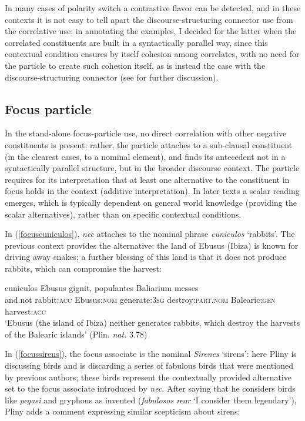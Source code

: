 \documentclass[output=paper,modfonts,nonflat,citecolor=brown,
showindex
]{langsci/langscibook}
\begin{document}
In many cases of polarity switch a contrastive flavor can be detected, and in these contexts it is not easy to tell apart the discourse-structuring connector use from the correlative use: in annotating the examples, I decided for the latter when the correlated constituents are built in a syntactically parallel way, since this contextual condition ensures by itself cohesion among correlates, with no need for the particle to create such cohesion itself, as is instead the case with the discourse-structuring connector (see \citealt[]{OrlandiniPoccetti07} for further discussion). 

\subsection{Focus particle} \label{functionfocusparticle}

In the stand-alone focus-particle use, no direct correlation with other negative constituents is present; rather, the particle attaches to a sub-clausal constituent (in the clearest cases, to a nominal element), and finds its antecedent not in a syntactically parallel structure, but in the broader discourse context. The particle requires for its interpretation that at least one alternative to the constituent in focus holds in the context (additive interpretation). In later texts a scalar reading emerges, which is typically dependent on general world knowledge (providing the scalar alternatives), rather than on specific contextual conditions. 

In (\ref{focuscuniculos}), {\emph{nec}} attaches to the nominal phrase {\emph{cuniculos}} `rabbits'. The previous context provides the alternative: the land of Ebusus (Ibiza) is known for driving away snakes; a further blessing of this land is that it does not produce rabbits, which can compromise the harvest: 

{\begin{exe}
\ex \label{focuscuniculos}  cuniculos Ebusus gignit, populantes Baliarium messes\\
and.not rabbit:{\textsc{acc}} Ebusus:{\textsc{nom}} generate:{\textsc{3sg}} destroy:{\textsc{part.nom}} Balearic:{\textsc{gen}} harvest:{\textsc{acc}}\\

`Ebusus (the island of Ibiza) neither generates rabbits, which destroy the harvests of the Balearic islands' (Plin. {\emph{nat.}} 3.78)
\end{exe}}

\noindent In (\ref{focussirens}), the focus associate is the nominal {\emph{Sirenes}} `sirens': here Pliny is discussing birds and is discarding a series of fabulous birds that were mentioned by previous authors; these birds represent the contextually provided alternative set to the focus associate introduced by {\emph{nec}}. After saying that he considers birds like {\emph{pegasi}} and gryphons as invented ({\emph{fabulosos reor}} `I consider them legendary'), Pliny adds a comment expressing similar scepticism about sirens:
\end{document}
